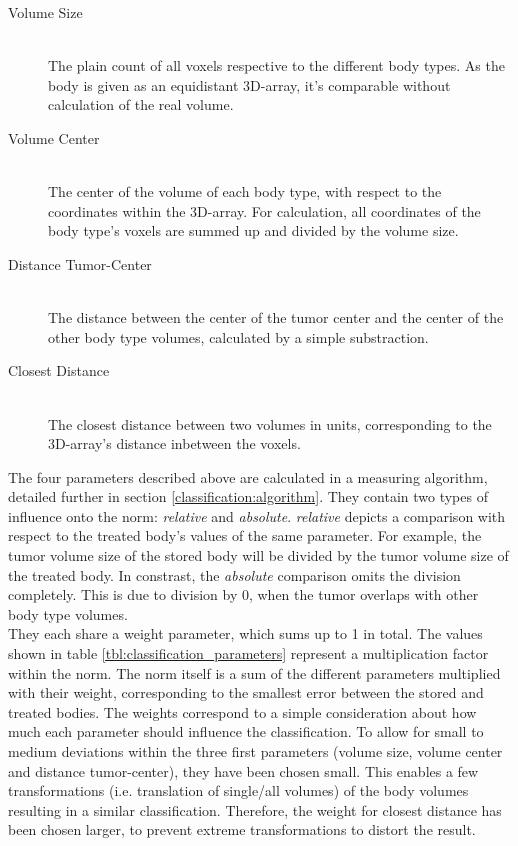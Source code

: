 \begin{description}
\item[Volume Size]~\\
The plain count of all voxels respective to the different body types. As the body is given as an equidistant 3D-array, it's comparable without calculation of the real volume.
\item[Volume Center]~\\ The center of the volume of each body type, with respect to the coordinates within the 3D-array. For calculation, all coordinates of the body type's voxels are summed up and divided by the volume size.
\item[Distance Tumor-Center]~\\ The distance between the center of the tumor center and the center of the other body type volumes, calculated by a simple substraction.
\item[Closest Distance]~\\ The closest distance between two volumes in units, corresponding to the 3D-array's distance inbetween the voxels.
\end{description}

The four parameters described above are calculated in a measuring algorithm, detailed further in section \ref{classification:algorithm}. They contain two types of influence onto the norm: \textit{relative} and \textit{absolute}. \textit{relative} depicts a comparison with respect to the treated body's values of the same parameter. For example, the tumor volume size of the stored body will be divided by the tumor volume size of the treated body. In constrast, the \textit{absolute} comparison omits the division completely. This is due to division by 0, when the tumor overlaps with other body type volumes. \\

They each share a weight parameter, which sums up to 1 in total. The values shown in table \ref{tbl:classification_parameters} represent a multiplication factor within the norm. The norm itself is a sum of the different parameters multiplied with their weight, corresponding to the smallest error between the stored and treated bodies. The weights correspond to a simple consideration about how much each parameter should influence the classification. To allow for small to medium deviations within the three first parameters (volume size, volume center and distance tumor-center), they have been chosen small. This enables a few transformations (i.e. translation of single/all volumes) of the body volumes resulting in a similar classification. Therefore, the weight for closest distance has been chosen larger, to prevent extreme transformations to distort the result. \\

